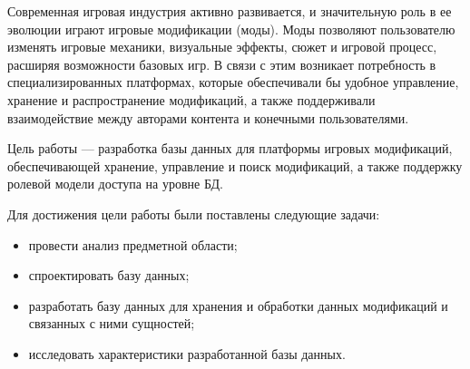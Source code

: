 
Современная игровая индустрия активно развивается, и значительную роль в ее эволюции играют игровые модификации (моды). Моды позволяют пользователю изменять игровые механики, визуальные эффекты, сюжет и игровой процесс, расширяя возможности базовых игр. В связи с этим возникает потребность в специализированных платформах, которые обеспечивали бы удобное управление, хранение и распространение модификаций, а также поддерживали взаимодействие между авторами контента и конечными пользователями.

Цель работы --- разработка базы данных для платформы игровых модификаций, обеспечивающей хранение, управление и поиск модификаций, а также поддержку ролевой модели доступа на уровне БД.

Для достижения цели работы были поставлены следующие задачи:
\begin{itemize}
	\item провести анализ предметной области;
	\item спроектировать базу данных;
	\item разработать базу данных для хранения и обработки данных модификаций и связанных с ними сущностей;
	\item исследовать характеристики разработанной базы данных.
\end{itemize}

\clearpage

